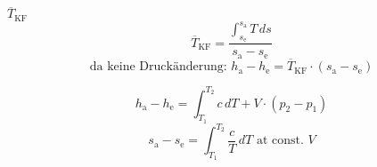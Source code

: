 \( \overline{T}_{\text{KF}} \)  
\[ \overline{T}_{\text{KF}} = \frac{\int_{s_{\text{e}}}^{s_{\text{a}}} T \, ds}{s_{\text{a}} - s_{\text{e}}} \]  
\[ \text{da keine Druckänderung: } h_{\text{a}} - h_{\text{e}} = \overline{T}_{\text{KF}} \cdot (s_{\text{a}} - s_{\text{e}}) \]  

\[ h_{\text{a}} - h_{\text{e}} = \int_{T_1}^{T_2} c \, dT + V \cdot (p_2 - p_1) \]  
\[ s_{\text{a}} - s_{\text{e}} = \int_{T_1}^{T_2} \frac{c}{T} \, dT \text{ at } \text{const. } V \]